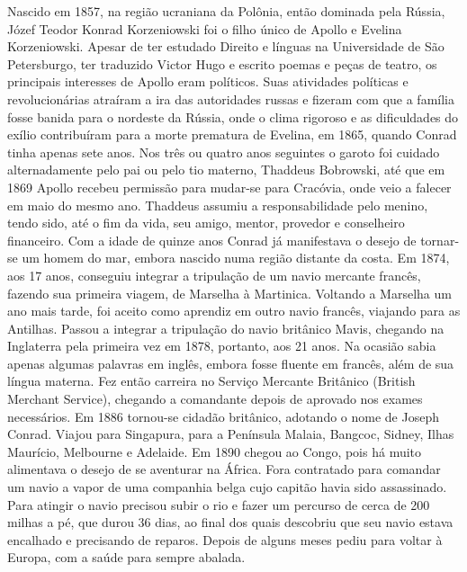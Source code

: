 Nascido em 1857, na região ucraniana da Polônia, então dominada pela
Rússia, Józef Teodor Konrad Korzeniowski foi o filho único de Apollo e
Evelina Korzeniowski. Apesar de ter estudado Direito e línguas na
Universidade de São Petersburgo, ter traduzido Victor Hugo e escrito
poemas e peças de teatro, os principais interesses de Apollo eram
políticos.  Suas atividades políticas e revolucionárias atraíram a ira
das autoridades russas e fizeram com que a família fosse banida para o
nordeste da Rússia, onde o clima rigoroso e as dificuldades do exílio
contribuíram para a morte prematura de Evelina, em 1865, quando Conrad
tinha apenas  sete anos. Nos três ou quatro anos seguintes o garoto foi
cuidado alternadamente pelo pai ou pelo tio materno, Thaddeus
Bobrowski, até que em 1869 Apollo recebeu permissão para mudar{}-se
para Cracóvia, onde veio a falecer em maio do mesmo ano. Thaddeus
assumiu a responsabilidade pelo menino, tendo sido, até o fim da  vida,
seu  amigo, mentor,  provedor e conselheiro financeiro. Com a idade de
quinze anos Conrad já \mbox{manifestava} o desejo de tornar{}-se um homem do
mar, embora nascido numa região distante da costa. Em 1874, aos 17
anos, conseguiu integrar a tripulação de um navio mercante francês,
fazendo sua primeira viagem, de Marselha à Martinica. Voltando a
Marselha um ano mais tarde, foi aceito como aprendiz em outro navio
francês, viajando para as Antilhas. Passou a integrar a tripulação do
navio britânico Mavis, chegando na Inglaterra pela primeira vez em
1878, portanto, aos 21 anos. Na ocasião sabia apenas algumas palavras
em inglês, embora fosse fluente em francês, além de sua língua materna.
Fez então carreira no Serviço Mercante Britânico (British Merchant
Service),  chegando  a comandante depois de aprovado nos exames
necessários. Em 1886 tornou{}-se cidadão britânico, adotando o nome de
Joseph Conrad. Viajou para Singapura, para a Península Malaia, Bangcoc, Sidney, Ilhas
Maurício, Melbourne e Adelaide. Em 1890 chegou ao Congo, pois há muito
alimentava o desejo de se aventurar na África. Fora contratado para
comandar um navio a vapor de uma companhia belga cujo capitão havia
sido assassinado. Para atingir o navio precisou subir o rio e fazer um
percurso de cerca de 200 milhas a pé, que durou 36 dias, ao final dos
quais descobriu que seu navio estava encalhado e precisando de reparos.
Depois de alguns meses pediu para voltar à Europa, com a saúde para sempre abalada.

